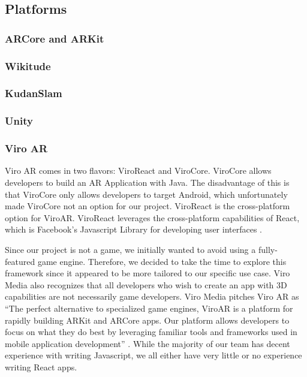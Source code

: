 \documentclass[a4paper, 10pt, american]{article}
\begin{document}
\lipsum[4-5]

\subsection{Platforms}
\label{sec:platforms}

\subsubsection{ARCore and ARKit}
\label{sec:ARCoreAndARKit}

\subsubsection{Wikitude}
\label{sec:wikitude}

\subsubsection{KudanSlam}
\label{sec:kudanSlam}

\subsubsection{Unity}
\label{sec:unity}

\subsubsection{Viro AR}
\label{sec:viroAR}

Viro AR comes in two flavors: ViroReact and ViroCore. ViroCore allows
developers to build an AR Application with Java. The disadvantage of this is
that ViroCore only allows developers to target Android, which unfortunately
made ViroCore not an option for our project. ViroReact is the cross-platform
option for ViroAR. ViroReact leverages the cross-platform capabilities of
React, which is Facebook's Javascript Library for developing user interfaces
\autocite{facebook2019}.

Since our project is not a game, we initially wanted to avoid using a
fully-featured game engine. Therefore, we decided to take the time to explore
this framework since it appeared to be more tailored to our specific use case.
Viro Media also recognizes that all developers who wish to create an app with
3D capabilities are not necessarily game developers. Viro Media pitches Viro
AR as ``The perfect alternative to specialized game engines, ViroAR is a
platform for rapidly building ARKit and ARCore apps. Our platform allows
developers to focus on what they do best by leveraging familiar tools and
frameworks used in mobile application development'' \autocite{viro2019}.
While the majority of our team has decent experience with writing Javascript,
we all either have very little or no experience writing React apps.
\end{document}
